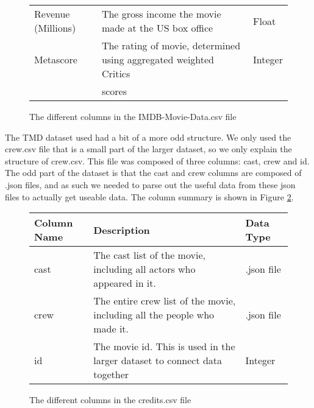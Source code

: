 \begin{figure}[h]
\begin{tabular}[width = \textwidth]{lll}
                Revenue (Millions) &    The gross income the movie made at the US box office                        & Float \\  
                Metascore   &           The rating of movie, determined using aggregated weighted Critics           & Integer \\
                {}          &           scores                                                                      & {} \\         
                \bottomrule
            \end{tabular}
            \caption[short]{The different columns in the IMDB-Movie-Data.csv file}\label{fig-IMDB-Movie-Data-Column-Description}
        \end{figure}
        \newline
        The TMD dataset used had a bit of a more odd structure.
        We only used the crew.csv file that is a small part of the larger dataset, so we only explain the structure of crew.csv.
        This file was composed of three columns: cast, crew and id.
        The odd part of the dataset is that the cast and crew columns are composed of .json files, and as such we needed to parse 
            out the useful data from these json files to actually get useable data.
        The column summary is shown in Figure \ref*{fig-Credits-Column-Description}.
        \begin{figure}[h]
            \centering
            \begin{tabular}[width = \textwidth]{lll}
                \toprule
                Column Name &           Description                                                                 & Data Type  \\
                \midrule
                cast &                  The cast list of the movie, including all actors who appeared in it.        & .json file \\          
                crew &                  The entire crew list of the movie, including all the people who made it.    & .json file \\
                id &                    The movie id. This is used in the larger dataset to connect data together   & Integer     \\        
                \bottomrule
            \end{tabular}
            \caption[short]{The different columns in the credits.csv file}\label{fig-Credits-Column-Description}
        \end{figure}

